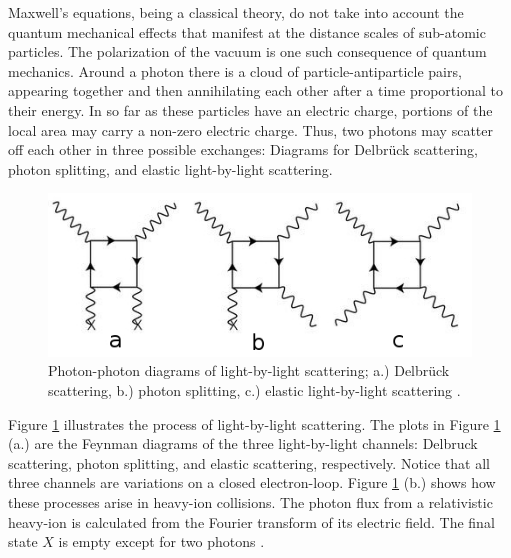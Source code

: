 Maxwell's equations, being a classical theory, do not take into account the quantum mechanical effects that manifest at the distance scales of sub-atomic particles. The polarization of the vacuum is one such consequence of quantum mechanics. Around a photon there is a cloud of particle-antiparticle pairs, appearing together and then annihilating each other after a time proportional to their energy. In so far as these particles have an electric charge, portions of the local area may carry a non-zero electric charge. Thus, two photons may scatter off each other in three possible exchanges: Diagrams for Delbrück scattering, photon splitting, and elastic light-by-light scattering. 

\begin{figure}[]
\begin{centering}
\includegraphics[width=5in]{Chapter2/importfigs/nphys4208-f1.jpg}
\par\end{centering}
\caption{Photon-photon diagrams of light-by-light scattering; a.) Delbr\"{u}ck scattering, b.) photon splitting, c.) elastic light-by-light scattering  \cite{Aaboud:2017bwk}. \label{fig:ggDiag}}
\end{figure}

Figure \ref{fig:ggDiag} illustrates the process of light-by-light scattering. The plots in Figure \ref{fig:ggDiag} (a.) are the Feynman diagrams of the three light-by-light channels: Delbruck scattering, photon splitting, and elastic scattering, respectively. Notice that all three channels are variations on a closed electron-loop. Figure \ref{fig:ggDiag} (b.) shows how these processes arise in heavy-ion collisions. The photon flux from a relativistic heavy-ion is calculated from the Fourier transform of its electric field. The final state $X$ is empty except for two photons \cite{Aaboud:2017bwk}. 

